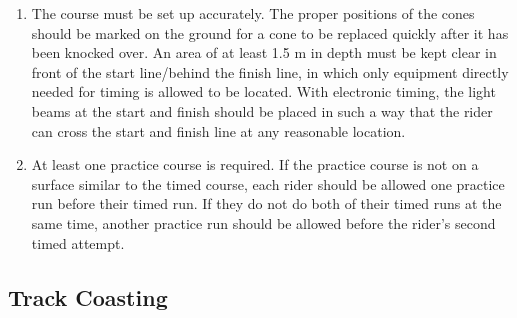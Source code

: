 \begin{enumerate}[leftmargin=1.5em,labelsep=*]
	\item The course must be set up accurately.
	The proper positions of the cones should be marked on the ground for a cone to be replaced quickly after it has been knocked over.
	An area of at least 1.5 m in depth must be kept clear in front of the start line/behind the finish line, 
  in which only equipment directly needed for timing is allowed to be located.
	With electronic timing, the light beams at the start and finish should be placed in such a way that the 
  rider can cross the start and finish line at any reasonable location.
	
	\item At least one practice course is required.
	If the practice course is not on a surface similar to the timed course, each rider should be allowed 
  one practice run before their timed run.
	If they do not do both of their timed runs at the same time, another practice run should be allowed 
  before the rider's second timed attempt.
\end{enumerate}

\subsection{Track Coasting}\label{subsec:TrackCoasting}


